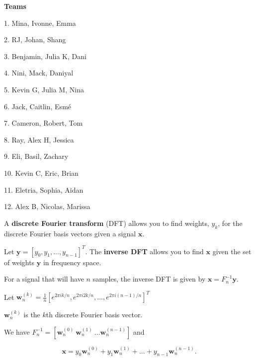 \documentclass[12pt,letterpaper,noanswers]{exam}
\newcommand{\vc}[1]{\boldsymbol{#1}}
\begin{document}
\noindent \textbf{Teams}
\begin{multicols}{3}
1. Mina, Ivonne, Emma

2.  RJ, Johan, Shang

3. Benjamin, Julia K, Dani

4. Nini, Mack, Daniyal

5. Kevin G, Julia M, Nina

6. Jack, Caitlin, Esmé

7. Cameron, Robert, Tom

8. Ray, Alex H, Jessica

9. Eli, Basil, Zachary

10.  Kevin C, Eric, Brian

11. Eletria, Sophia, Aidan

12. Alex B, Nicolas, Marissa

\end{multicols}


\begin{tcolorbox}
A \textbf{discrete Fourier transform} (DFT) allows you to find weights, $y_k$, for the discrete Fourier basis vectors given a signal $\vc{x}$.

 Let $\vc{y} = [y_0, y_1,...,y_{n-1}]^T$.  The \textbf{inverse DFT} allows you to find $\vc{x}$ given the set of weights $\vc{y}$ in frequency space.

\end{tcolorbox}

\begin{tcolorbox}
For a signal that will have $n$ samples, the inverse DFT is given by 
 $\vc{x} = F_n^{-1}\vc{y}.$
 
Let $\vc{w}_n^{(k)} = \frac{1}{n}\left[e^{2\pi i k/n},
e^{2\pi i 2k/n},
\hdots, 
e^{2\pi i (n-1)/n}\right]^T$ 

$\vc{w}_n^{(k)}$ is the $k$th discrete Fourier basis vector.

We have $F_n^{-1} = \left[\vc{w}_n^{(0)}\  \vc{w}_n^{(1)}\  \hdots\vc{w}_n^{(n-1)}\right]$ and

\[\vc{x} = y_0\vc{w}_n^{(0)} +  y_1\vc{w}_n^{(1)}+...+y_{n-1}\vc{w}_n^{(n-1)}.\]
\end{tcolorbox}
\end{document}
